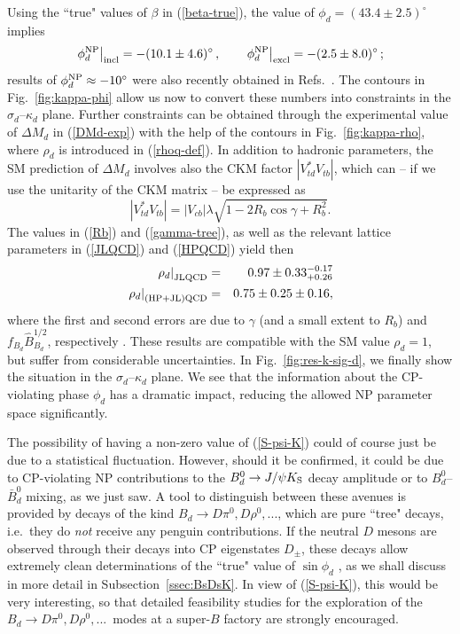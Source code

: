 \documentclass[12pt]{article}
\begin{document}
Using the ``true" values of $\beta$ in (\ref{beta-true}), the value of
$\phi_d=(43.4\pm2.5)^\circ$ implies
\begin{equation}\label{phiNPd-num}
\left.\phi^{\rm NP}_d\right|_{\rm incl} = -(10.1\pm 4.6)^\circ\,,\qquad
\left.\phi^{\rm NP}_d\right|_{\rm excl} = -(2.5\pm 8.0)^\circ\,;
\end{equation}
results of $\phi_d^{\rm NP}\approx-10^\circ$ were also recently obtained in 
Refs.~\cite{BFRS-5,UTfit-NP}. The contours in Fig.~\ref{fig:kappa-phi} allow us now
to convert these numbers into constraints in the $\sigma_d$--$\kappa_d$ 
plane. Further constraints can be obtained through the experimental value of 
$\Delta M_d$ in (\ref{DMd-exp}) with the help of the contours in
Fig.~\ref{fig:kappa-rho}, where $\rho_d$ is introduced in (\ref{rhoq-def}).
In addition to  hadronic parameters, the SM prediction of $\Delta M_d$ involves 
also the CKM factor $|V_{td}^\ast V_{tb}|$, which can -- if we use the unitarity of the 
CKM matrix -- be expressed as
\begin{equation}\label{CKM-Bd}
|V_{td}^\ast V_{tb}|=|V_{cb}|\lambda\sqrt{1-2R_b\cos\gamma+R_b^2}.
\end{equation}
The values in (\ref{Rb}) and (\ref{gamma-tree}), as well as the relevant 
lattice parameters in (\ref{JLQCD}) and (\ref{HPQCD}) yield then
\begin{eqnarray}
\left.\rho_d\right|_{\rm JLQCD} &=&
  0.97\pm0.33^{-0.17}_{+0.26}\label{rhod-JLQCD}\\
\left.\rho_d\right|_{\rm  (HP+JL)QCD} &=& 
0.75\pm0.25\pm0.16,\label{rhod-HPJL}
\end{eqnarray}
where the first and second errors are due to $\gamma$ (and a small extent to
$R_b$) and $f_{B_d} \hat B_{B_d}^{1/2}$, respectively \cite{BF-DMs}. 
These results are compatible with the SM value $\rho_d=1$, but suffer from 
considerable uncertainties. In Fig.~\ref{fig:res-k-sig-d}, we finally show the
situation in the $\sigma_d$--$\kappa_d$ plane. We see that the information
about the CP-violating phase $\phi_d$ has a dramatic impact, reducing
the allowed NP parameter space significantly. 

The possibility of having a non-zero value of (\ref{S-psi-K}) could of course just 
be due to a statistical fluctuation. However, should it be confirmed, 
it could be due to CP-violating NP contributions to the $B^0_d\to J/\psi K_{\rm S}$ 
decay amplitude or to $B^0_d$--$\bar B^0_d$ mixing, as we just saw.
A tool to distinguish between these avenues is provided by decays 
of the kind $B_d\to D\pi^0, D\rho^0, ...$, which are pure ``tree" decays, i.e.\
they do {\it not} receive any penguin contributions. If the neutral $D$ mesons
are observed through their decays into CP eigenstates $D_\pm$, these decays
allow extremely clean determinations of the ``true" value of $\sin\phi_d$ 
\cite{RF-BdDpi0}, as we shall discuss in more detail in Subsection~\ref{ssec:BsDsK}. 
In view of (\ref{S-psi-K}), this would be very interesting, so that detailed 
feasibility studies for the exploration of the $B_d\to D\pi^0, D\rho^0, ...$\ modes 
at a super-$B$ factory are strongly encouraged. 
\end{document}
